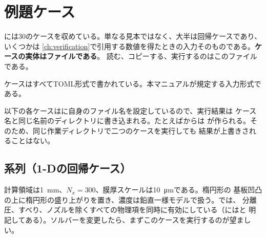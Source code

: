 \chapter{例題ケース}
\label{ch:cases}

には30のケースを収めている。単なる見本ではなく、大半は回帰ケースであり、いくつかは
\cref{ch:verification}で引用する数値を得たときの入力そのものである。\textbf{ケースの実体はファイルである}。
読む、コピーする、実行するのはこのファイルである。

ケースはすべてTOML形式で書かれている。本マニュアルが規定する入力形式である。

\begin{note}[ケースごとに結果ディレクトリが分かれる]
  以下の各ケースはに自身のファイル名を設定しているので、実行結果は
  ケース名と同じ名前のディレクトリに書き込まれる。たとえばからは
  が作られる。そのため、同じ作業ディレクトリで二つのケースを実行しても
  結果が上書きされることはない。
\end{note}

\section{系列（1-Dの回帰ケース）}
\label{sec:cases:case01}

計算領域は\SI{1}{\milli\metre}、$N_x = 300$、膜厚スケールは\SI{10}{\micro\metre}である。楕円形の
基板凹凸の上に楕円形の盛り上がりを置き、濃度は鉛直一様モデルで扱う。では、
分離圧、すべり、ノズルを除くすべての物理項を同時に有効にしている（にはと
明記してある）。ソルバーを変更したら、まずこのケースを実行するのが望ましい。

